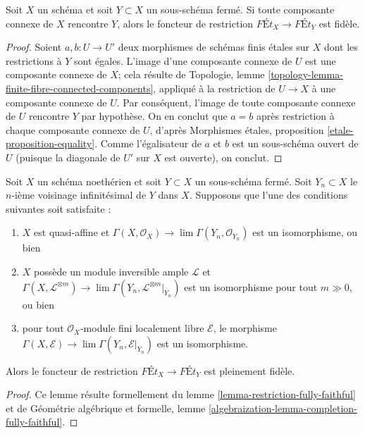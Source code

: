 \begin{lemma}
\label{lemma-restriction-faithful}
Soit $X$ un schéma et soit $Y \subset X$ un sous-schéma fermé.
Si toute composante connexe de $X$ rencontre $Y$, alors
le foncteur de restriction $\textit{F\'Et}_X \to \textit{F\'Et}_Y$
est fidèle.
\end{lemma}

\begin{proof}
Soient $a, b : U \to U'$ deux morphismes de schémas finis étales sur $X$
dont les restrictions à $Y$ sont égales. L'image d'une composante connexe
de $U$ est une composante connexe de $X$; cela résulte de
Topologie, lemme \ref{topology-lemma-finite-fibre-connected-components},
appliqué à la restriction de $U \to X$ à une composante connexe de $U$.
Par conséquent, l'image de toute composante connexe de $U$ rencontre $Y$
par hypothèse. On en conclut que $a = b$ après restriction à chaque
composante connexe de $U$, d'après Morphismes étales, proposition
\ref{etale-proposition-equality}. Comme l'égalisateur de $a$ et $b$
est un sous-schéma ouvert de $U$ (puisque la diagonale de $U'$ sur $X$ est ouverte),
on conclut.
\end{proof}

\begin{lemma}
\label{lemma-restriction-fully-faithful-special}
Soit $X$ un schéma noethérien et soit $Y \subset X$ un sous-schéma fermé.
Soit $Y_n \subset X$ le $n$-ième voisinage infinitésimal de $Y$ dans $X$.
Supposons que l'une des conditions suivantes soit satisfaite :
\begin{enumerate}
\item $X$ est quasi-affine et
$\Gamma(X, \mathcal{O}_X) \to \lim \Gamma(Y_n, \mathcal{O}_{Y_n})$
est un isomorphisme, ou bien
\item $X$ possède un module inversible ample $\mathcal{L}$ et
$\Gamma(X, \mathcal{L}^{\otimes m}) \to
\lim \Gamma(Y_n, \mathcal{L}^{\otimes m}|_{Y_n})$
est un isomorphisme pour tout $m \gg 0$, ou bien
\item pour tout $\mathcal{O}_X$-module fini localement libre
$\mathcal{E}$, le morphisme
$\Gamma(X, \mathcal{E}) \to \lim \Gamma(Y_n, \mathcal{E}|_{Y_n})$
est un isomorphisme.
\end{enumerate}
Alors le foncteur de restriction $\textit{F\'Et}_X \to \textit{F\'Et}_Y$
est pleinement fidèle.
\end{lemma}

\begin{proof}
Ce lemme résulte formellement du
lemme \ref{lemma-restriction-fully-faithful} et de
Géométrie algébrique et formelle, lemme
\ref{algebraization-lemma-completion-fully-faithful}.
\end{proof}

